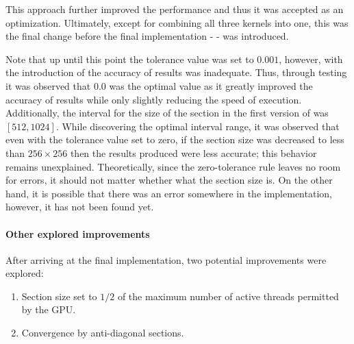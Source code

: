 This approach further improved the performance and thus it was accepted as an optimization. Ultimately, except for combining all three kernels into one, this was the final change before the final implementation - \textit{} - was introduced.
\par Note that up until this point the tolerance value was set to $ 0.001 $, however, with the introduction of \textit{} the accuracy of results was inadequate. Thus, through testing it was observed that $ 0.0 $ was the optimal value as it greatly improved the accuracy of results while only slightly reducing the speed of execution. \\
Additionally, the interval for the size of the section in the first version of \textit{} was $ \left[512, 1024\right] $. While discovering the optimal interval range, it was observed that even with the tolerance value set to zero, if the section size was decreased to less than $ 256 \times 256 $ then the results produced were less accurate; this behavior remains unexplained. Theoretically, since the zero-tolerance rule leaves no room for errors, it should not matter whether what the section size is. On the other hand, it is possible that there was an error somewhere in the implementation, however, it has not been found yet.

\paragraph{Other explored improvements} After arriving at the final implementation, two potential improvements were explored:

\begin{enumerate}
	\item Section size set to $ 1/2 $ of the maximum number of active threads permitted by the GPU.
	\item Convergence by anti-diagonal sections.
\end{enumerate}


